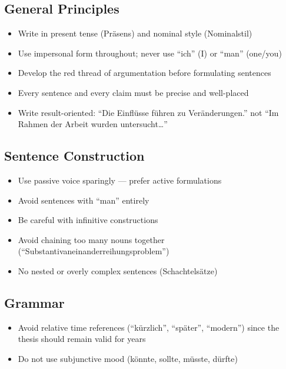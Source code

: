 \subsection{General Principles}
\begin{itemize}
    \item Write in present tense (Pr\"asens) and nominal style (Nominalstil)
    \item Use impersonal form throughout; never use ``ich'' (I) or ``man'' (one/you)
    \item Develop the red thread of argumentation before formulating sentences
    \item Every sentence and every claim must be precise and well-placed
    \item Write result-oriented: ``Die Einfl\"usse f\"uhren zu Ver\"anderungen.'' not ``Im Rahmen der Arbeit wurden untersucht\ldots''
\end{itemize}

\subsection{Sentence Construction}
\begin{itemize}
    \item Use passive voice sparingly --- prefer active formulations
    \item Avoid sentences with ``man'' entirely
    \item Be careful with infinitive constructions
    \item Avoid chaining too many nouns together (``Substantivaneinanderreihungsproblem'')
    \item No nested or overly complex sentences (Schachtels\"atze)
\end{itemize}

\subsection{Grammar}
\begin{itemize}
    \item Avoid relative time references (``k\"urzlich'', ``sp\"ater'', ``modern'') since the thesis should remain valid for years
    \item Do not use subjunctive mood (k\"onnte, sollte, m\"usste, d\"urfte)
\end{itemize}

